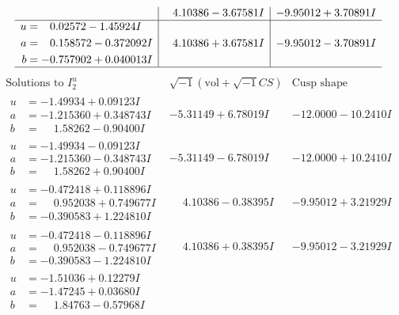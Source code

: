 \documentclass[1p]{elsarticle_modified}
\theoremstyle{definition}
\newcommand{\I}{\sqrt{-1}}
\begin{document}
$$\begin{array}{c|c|c}
 & \phantom{-}4.10386 - 3.67581 I & -9.95012 + 3.70891 I \\ \hline\begin{aligned}
u &= \phantom{-}0.02572 - 1.45924 I \\
a &= \phantom{-}0.158572 - 0.372092 I \\
b &= -0.757902 + 0.040013 I\end{aligned}
 & \phantom{-}4.10386 + 3.67581 I & -9.95012 - 3.70891 I\\
 \hline 
 \end{array}$$\newpage$$\begin{array}{c|c|c}  
\text{Solutions to }I^u_{2}& \I (\text{vol} + \sqrt{-1}CS) & \text{Cusp shape}\\
 \hline 
\begin{aligned}
u &= -1.49934 + 0.09123 I \\
a &= -1.215360 + 0.348743 I \\
b &= \phantom{-}1.58262 - 0.90400 I\end{aligned}
 & -5.31149 + 6.78019 I & -12.0000 - 10.2410 I \\ \hline\begin{aligned}
u &= -1.49934 - 0.09123 I \\
a &= -1.215360 - 0.348743 I \\
b &= \phantom{-}1.58262 + 0.90400 I\end{aligned}
 & -5.31149 - 6.78019 I & -12.0000 + 10.2410 I \\ \hline\begin{aligned}
u &= -0.472418 + 0.118896 I \\
a &= \phantom{-}0.952038 + 0.749677 I \\
b &= -0.390583 + 1.224810 I\end{aligned}
 & \phantom{-}4.10386 - 0.38395 I & -9.95012 + 3.21929 I \\ \hline\begin{aligned}
u &= -0.472418 - 0.118896 I \\
a &= \phantom{-}0.952038 - 0.749677 I \\
b &= -0.390583 - 1.224810 I\end{aligned}
 & \phantom{-}4.10386 + 0.38395 I & -9.95012 - 3.21929 I \\ \hline\begin{aligned}
u &= -1.51036 + 0.12279 I \\
a &= -1.47245 + 0.03680 I \\
b &= \phantom{-}1.84763 - 0.57968 I\end{aligned}

\end{array}$$
\end{document}
